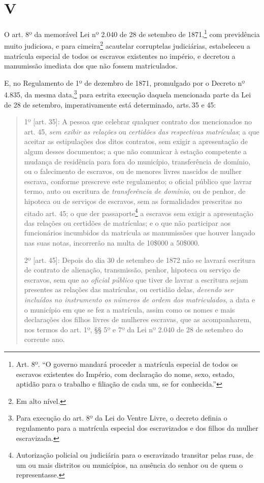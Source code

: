 {\section*{V}

O art. 8º da memorável Lei nº 2.040 de 28 de setembro de 1871,\footnote{
  Art. 8º. ``O governo mandará proceder a matrícula especial de todos os
  escravos existentes do Império, com declaração do nome, sexo, estado,
  aptidão para o trabalho e filiação de cada um, se for conhecida.''} com
previdência muito judiciosa, e para cimeira\footnote{Em alto nível.}
acautelar corruptelas judiciárias, estabeleceu a matrícula especial de
todos os escravos existentes no império, e decretou a manumissão
imediata dos que não fossem matriculados.

E, no Regulamento de 1º de dezembro de 1871, promulgado por o Decreto nº
4.835, da mesma data,\footnote{Para execução do art. 8º da Lei do
  Ventre Livre, o decreto definia o regulamento para a matrícula
  especial dos escravizados e dos filhos da mulher escravizada.} para
estrita execução daquela mencionada parte da Lei de 28 de setembro,
imperativamente está determinado, arts.\,35 e 45:

\begin{quote}
1º {[}art. 35{]}: A pessoa que celebrar qualquer contrato dos
mencionados no art. 45, \emph{sem exibir as relações} ou \emph{certidões
das respectivas matrículas}; a que aceitar as estipulações dos ditos
contratos, sem exigir a apresentação de algum desses documentos; a que
não comunicar à estação competente a mudança de residência para fora do
município, transferência de domínio, ou o falecimento de escravos, ou de
menores livres nascidos de mulher escrava, conforme prescreve este
regulamento; o oficial público que lavrar termo, auto ou escritura de
\emph{transferência de domínio}, ou de penhor, de hipoteca ou de
serviços de escravos, sem as formalidades prescritas no citado art. 45;
o que der passaporte\footnote{Autorização policial ou judiciária para
  o escravizado transitar pelas ruas, de um ou mais distritos ou
  municípios, na ausência do senhor ou de quem o representasse.} a escravos
sem exigir a apresentação das relações ou certidões de matrículas; e o
que não participar aos funcionários incumbidos da matrícula as
manumissões que houver lançado nas suas notas, incorrerão na multa de
10\$000 a 50\$000.

2º {[}art. 45{]}: Depois do dia 30 de setembro de 1872 não se lavrará
escritura de contrato de alienação, transmissão, penhor, hipoteca ou
serviço de escravos, sem que ao \emph{oficial público} que tiver de
lavrar a escritura sejam presentes as relações das matrículas, ou
certidão delas, \emph{devendo ser incluídos no instrumento os números de
ordem dos matriculados}, a data e o município em que se fez a matrícula,
assim como os nomes e mais declarações dos filhos livres de mulheres
escravas, que as acompanharem, nos termos do art. 1º, §§ 5º e 7º da Lei
nº 2.040 de 28 de setembro do corrente ano.


\end{quote}}
